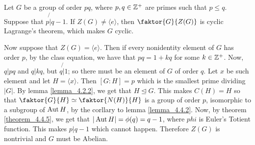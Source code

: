 \begin{example}\label{example_4.11}
  Let $G$ be a group of order $pq$, where $p,q \in \mathbb{Z}^+$ are primes such that
  $p \leq q$. Suppose that  $p \not{|} q-1$. If $Z(G) \neq \langle e
  \rangle$, then $\faktor{G}{Z(G)}$ is cyclic Lagrange's theorem, which makes
  $G$ cyclic.

  Now suppose that $Z(G)=\langle e \rangle$. Then if every nonidentity
  element of $G$ has order  $p$, by the class equation, we have that
  $pq=1+kq$ for some  $k \in \mathbb{Z}^+$. Now,  $q|pq$ and  $q|kq$, but  $q \not{|}
  1$; so there must be an element of $G$ of order $q$. Let $x$ be such
  element and let  $H=\langle x \rangle$. Then $[G:H]=p$ which is the
  smallest prime dividing $|G|$. By lemma \ref{lemma_4.2.2}, we get that $H
  \unlhd G$. This makes  $C(H)=H$ so that $\faktor{G}{H} \simeq
  \faktor{N(H)}{H}$ is a group of order $p$, isomorphic to a subgroup of
  $\operatorname{Aut}{H}$, by the corllary to lemma \ref{lemma_4.4.2}. Now, by theorem
  \ref{theorem_4.4.5}, we get that $|\operatorname{Aut}{H}|=\phi(q)=q-1$, where $phi$ is
  Euler's Totient function. This makes $p|q-1$ which cannot happen. Therefore
  $Z(G)$ is nontrivial and $G$ must be Abelian.
\end{example}


